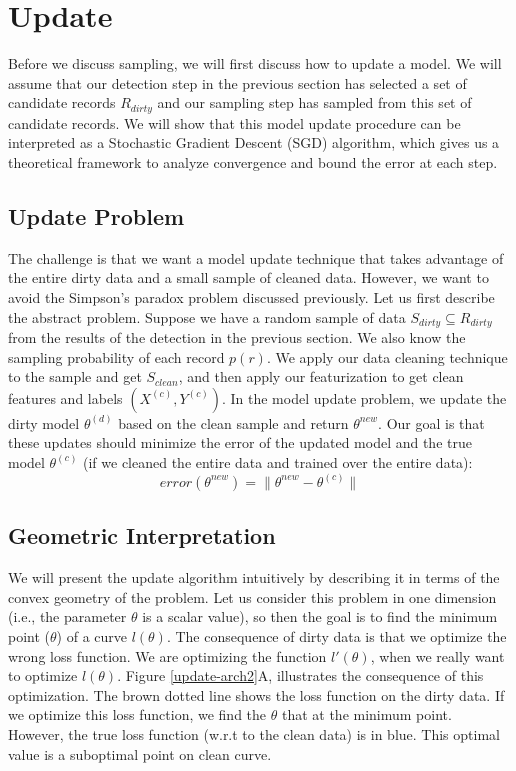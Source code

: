 \section{Update}\label{model-update}
Before we discuss sampling, we will first discuss how to update a model.
We will assume that our detection step in the previous section has selected 
a set of candidate records $R_{dirty}$ and our sampling step has sampled from this
set of candidate records.
We will show that this model update procedure can be interpreted as a Stochastic 
Gradient Descent (SGD) algorithm, which gives us a theoretical framework to analyze
convergence and bound the error at each step.

\subsection{Update Problem}
The challenge is that we want a model update technique that takes advantage of the entire dirty data and a small sample of cleaned data.
However, we want to avoid the Simpson's paradox problem discussed previously.
Let us first describe the abstract problem.
Suppose we have a random sample of data $S_{dirty} \subseteq R_{dirty}$ from the results of the detection in the previous section.
We also know the sampling probability of each record $p(r)$.
We apply our data cleaning technique to the sample and get $S_{clean}$, and then apply our featurization to get clean features and labels $(X^{(c)},Y^{(c)})$. 
In the model update problem, we update the dirty model $\theta^{(d)}$ based on the clean sample and return $\theta^{new}$.
Our goal is that these updates should minimize the error of the updated model and the true model $\theta^{(c)}$ (if we cleaned the entire data and trained over the entire data):
\[
error(\theta^{new}) = \| \theta^{new} - \theta^{(c)} \|
\]

\subsection{Geometric Interpretation}
We will present the update algorithm intuitively by describing it in terms of the convex geometry of the problem.
Let us consider this problem in one dimension (i.e., the parameter $\theta$ is a scalar value), so then the goal is to find the minimum point ($\theta$) of a curve $l(\theta)$.
The consequence of dirty data is that we optimize the wrong loss function.
We are optimizing the function $l'(\theta)$, when we really want to optimize $l(\theta)$.
Figure \ref{update-arch2}A, illustrates the consequence of this optimization.
The brown dotted line shows the loss function on the dirty data.
If we optimize this loss function, we find the $\theta$ that at the minimum point.
However, the true loss function (w.r.t to the clean data) is in blue.
This optimal value is a suboptimal point on clean curve.

